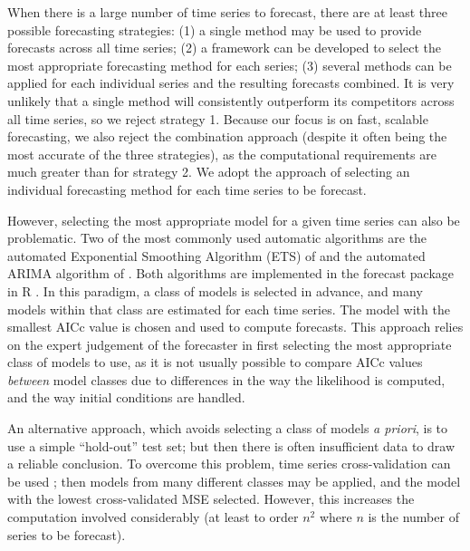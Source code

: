 \documentclass[11pt,a4paper,]{article}
\theoremstyle{definition}
\theoremstyle{definition}
\theoremstyle{definition}
\theoremstyle{remark}
\begin{document}
When there is a large number of time series to forecast, there are at
least three possible forecasting strategies: (1) a single method may be
used to provide forecasts across all time series; (2) a framework can be
developed to select the most appropriate forecasting method for each
series; (3) several methods can be applied for each individual series
and the resulting forecasts combined. It is very unlikely that a single
method will consistently outperform its competitors across all time
series, so we reject strategy 1. Because our focus is on fast, scalable
forecasting, we also reject the combination approach (despite it often
being the most accurate of the three strategies), as the computational
requirements are much greater than for strategy 2. We adopt the approach
of selecting an individual forecasting method for each time series to be
forecast.

However, selecting the most appropriate model for a given time series
can also be problematic. Two of the most commonly used automatic
algorithms are the automated Exponential Smoothing Algorithm (ETS) of
\textcite{Hyndman2002} and the automated ARIMA algorithm of
\textcite{Hyndman2008}. Both algorithms are implemented in the forecast
package in R \autocite{forecast}. In this paradigm, a class of models is
selected in advance, and many models within that class are estimated for
each time series. The model with the smallest AICc value is chosen and
used to compute forecasts. This approach relies on the expert judgement
of the forecaster in first selecting the most appropriate class of
models to use, as it is not usually possible to compare AICc values
\emph{between} model classes due to differences in the way the
likelihood is computed, and the way initial conditions are handled.

An alternative approach, which avoids selecting a class of models
\emph{a priori}, is to use a simple ``hold-out'' test set; but then
there is often insufficient data to draw a reliable conclusion. To
overcome this problem, time series cross-validation can be used
\autocite{hyndman2014forecasting}; then models from many different
classes may be applied, and the model with the lowest cross-validated
MSE selected. However, this increases the computation involved
considerably (at least to order \(n^2\) where \(n\) is the number of
series to be forecast).
\end{document}
